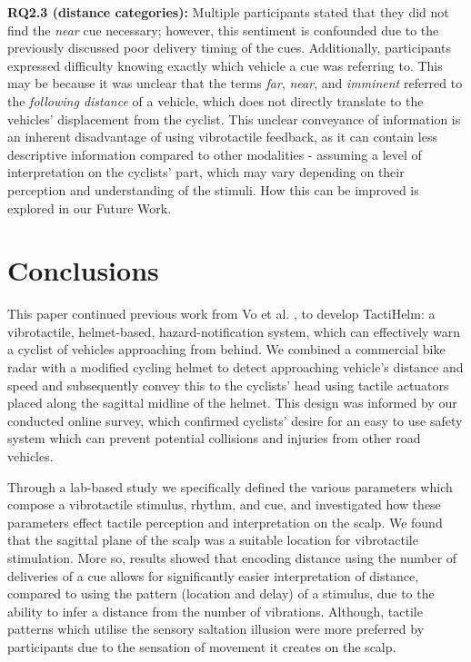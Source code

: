 \documentclass{mpaper}
\begin{document}
\textbf{RQ2.3 (distance categories):} Multiple participants stated that they did not find the \textit{near} cue necessary; however, this sentiment is confounded due to the previously discussed poor delivery timing of the cues. Additionally, participants expressed difficulty knowing exactly which vehicle a cue was referring to. This may be because it was unclear that the terms \textit{far}, \textit{near}, and \textit{imminent} referred to the \textit{following distance} of a vehicle, which does not directly translate to the vehicles' displacement from the cyclist. This unclear conveyance of information is an inherent disadvantage of using vibrotactile feedback, as it can contain less descriptive information compared to other modalities - assuming a level of interpretation on the cyclists' part, which may vary depending on their perception and understanding of the stimuli. How this can be improved is explored in our Future Work.




\section{Conclusions}
This paper continued previous work from Vo et al. \cite{10.1145/3411763.3451580}, to develop TactiHelm: a vibrotactile, helmet-based, hazard-notification system, which can effectively warn a cyclist of vehicles approaching from behind. We combined a commercial bike radar with a modified cycling helmet to detect approaching vehicle's distance and speed and subsequently convey this to the cyclists' head using tactile actuators placed along the sagittal midline of the helmet. This design was informed by our conducted online survey, which confirmed cyclists' desire for an easy to use safety system which can prevent potential collisions and injuries from other road vehicles.

Through a lab-based study we specifically defined the various parameters which compose a vibrotactile stimulus, rhythm, and cue, and investigated how these parameters effect tactile perception and interpretation on the scalp. We found that the sagittal plane of the scalp was a suitable location for vibrotactile stimulation. More so, results showed that encoding distance using the number of deliveries of a cue allows for significantly easier interpretation of distance, compared to using the pattern (location and delay) of a stimulus, due to the ability to infer a distance from the number of vibrations. Although, tactile patterns which utilise the sensory saltation illusion were more preferred by participants due to the sensation of movement it creates on the scalp.
\end{document}
